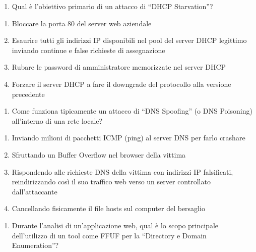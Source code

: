 \documentclass[11pt,a4paper]{article}
\providecommand{\tightlist}{%
  \setlength{\itemsep}{0pt}\setlength{\parskip}{0pt}}
\begin{document}
\begin{enumerate}
\def\labelenumi{\arabic{enumi}.}
\setcounter{enumi}{11}
\tightlist
\item
  Qual è l'obiettivo primario di un attacco di ``DHCP Starvation''?
\end{enumerate}

\begin{enumerate}
\def\labelenumi{\Alph{enumi})}
\tightlist
\item
  Bloccare la porta 80 del server web aziendale
\item
  Esaurire tutti gli indirizzi IP disponibili nel pool del server DHCP
  legittimo inviando continue e false richieste di assegnazione
\item
  Rubare le password di amministratore memorizzate nel server DHCP
\item
  Forzare il server DHCP a fare il downgrade del protocollo alla
  versione precedente
\end{enumerate}

\begin{enumerate}
\def\labelenumi{\arabic{enumi}.}
\setcounter{enumi}{12}
\tightlist
\item
  Come funziona tipicamente un attacco di ``DNS Spoofing'' (o DNS
  Poisoning) all'interno di una rete locale?
\end{enumerate}

\begin{enumerate}
\def\labelenumi{\Alph{enumi})}
\tightlist
\item
  Inviando milioni di pacchetti ICMP (ping) al server DNS per farlo
  crashare
\item
  Sfruttando un Buffer Overflow nel browser della vittima
\item
  Rispondendo alle richieste DNS della vittima con indirizzi IP
  falsificati, reindirizzando così il suo traffico web verso un server
  controllato dall'attaccante
\item
  Cancellando fisicamente il file hosts sul computer del bersaglio
\end{enumerate}

\begin{enumerate}
\def\labelenumi{\arabic{enumi}.}
\setcounter{enumi}{13}
\tightlist
\item
  Durante l'analisi di un'applicazione web, qual è lo scopo principale
  dell'utilizzo di un tool come FFUF per la ``Directory e Domain
  Enumeration''?
\end{enumerate}
\end{document}
